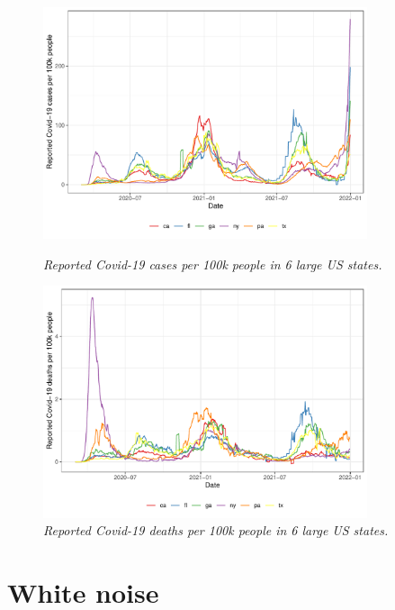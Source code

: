\documentclass{article}
\begin{document}
\begin{figure}[p]
\centering
\includegraphics[width=0.85\textwidth]{fig/covid-1.pdf}
\caption{\it Reported Covid-19 cases per 100k people in 6 large US states.}
\label{fig:covid-cases}

\bigskip\bigskip
\includegraphics[width=0.85\textwidth]{fig/covid-2.pdf}
\caption{\it Reported Covid-19 deaths per 100k people in 6 large US states.}
\label{fig:covid-deaths}
\end{figure}

\section{White noise}
\end{document}
